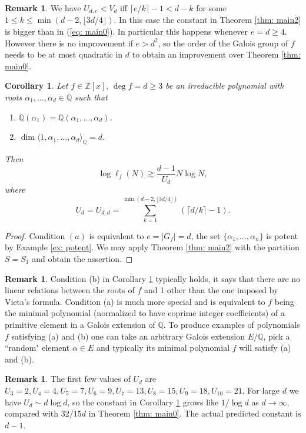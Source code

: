 \documentclass[alphabetic]{amsart}
\newtheorem{cor}[claim]{Corollary}
\theoremstyle{definition}
\newtheorem{rem}[claim]{Remark}
\numberwithin{equation}{section}
\newcommand{\Z}{{\mathbb Z}}
\newcommand{\Q}{{\mathbb Q}}
\newcommand{\Qb}{{\overline{\Q}}}
\numberwithin{equation}{section}
\begin{document}
\begin{rem} We have $U_{d,e}<V_d$ iff $\lceil e/k\rceil-1<d-k$ for some $1\le k\le \min(d-2,\lfloor 3d/4\rfloor)$. In this case the constant in Theorem \ref{thm: main2} is bigger than in (\ref{eq: main0}). In particular this happens whenever $e=d\ge 4$. However there is no improvement if $e>d^2$, so the order of the Galois group of $f$ needs to be at most quadratic in $d$ to obtain an improvement over Theorem \ref{thm: main0}.\end{rem}

\begin{cor}\label{cor: main2} Let $f\in\Z[x],\,\deg f=d\ge 3$ be an irreducible polynomial with roots $\alpha_1,\ldots,\alpha_d\in\Qb$ such that
\begin{enumerate}
    \item [(a)] $\Q(\alpha_1)=\Q(\alpha_1,\ldots,\alpha_d)$.
    \item [(b)] $\dim\langle 1,\alpha_1,\ldots,\alpha_d\rangle_{\Q}=d$.
\end{enumerate}
Then $$\log \ell_f(N)\gtrsim \frac {d-1}{U_d}N\log N,$$ where $$U_d=U_{d,d}=\sum_{k=1}^{\min(d-2,\lfloor 3d/4\rfloor)}(\lceil d/k\rceil-1).$$
\end{cor}

\begin{proof} Condition $(a)$ is equivalent to $e=|G_f|=d$, the set $\{\alpha_1,\ldots,\alpha_n\}$ is potent by Example \ref{ex: potent}. We may apply Theorem \ref{thm: main2} with the partition $S=S_1$ and obtain the assertion.
\end{proof}

\begin{rem} Condition (b) in Corollary \ref{cor: main2} typically holds, it says that there are no linear relations between the roots of $f$ and 1 other than the one imposed by Vieta's formula. Condition (a) is much more special and is equivalent to $f$ being the minimal polynomial (normalized to have coprime integer coefficients) of a primitive element in a Galois extension of $\Q$. To produce examples of polynomials $f$ satisfying (a) and (b) one can take an arbitrary Galois extension $E/\Q$, pick a ``random" element $\alpha\in E$ and typically its minimal polynomial $f$ will satisfy (a) and (b).
\end{rem}

\begin{rem} The first few values of $U_d$ are $U_3=2, U_4=4, U_5=7, U_6=9, U_7=13, U_8=15, U_9=18, U_{10}=21$. For large $d$ we have $U_d\sim d\log d$, so the constant in Corollary \ref{cor: main2} grows like $1/\log d$ as $d\to\infty$, compared with $32/15d$ in Theorem \ref{thm: main0}. The actual predicted constant is $d-1$.
\end{rem}
\end{document}
